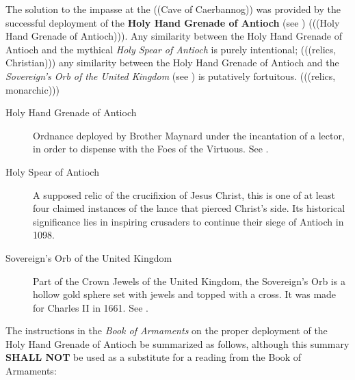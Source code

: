 \documentclass{metanorma}
\let\bcp\relax%
\begin{document}

The solution to the impasse at the ((Cave of Caerbannog)) was
provided by the successful deployment of the
\textbf{Holy Hand Grenade of Antioch} (see )
(((Holy Hand Grenade of Antioch))).
Any similarity between the Holy Hand Grenade of Antioch and the
mythical \textit{Holy Spear of Antioch} is purely intentional;
(((relics, Christian))) any similarity between the Holy Hand Grenade
of Antioch and the \textit{Sovereign's Orb of the United Kingdom}
(see ) is putatively fortuitous.
(((relics, monarchic)))



\begin{description}
  \item[Holy Hand Grenade of Antioch]
    Ordnance deployed by Brother Maynard under the incantation of a
    lector, in order to dispense with the Foes of the Virtuous.
    See .
  \item[Holy Spear of Antioch]
    A supposed relic of the crucifixion of Jesus Christ, this is one
    of at least four claimed instances of the lance that pierced
    Christ's side. Its historical significance lies in inspiring
    crusaders to continue their siege of Antioch in 1098.
  \item[Sovereign's Orb of the United Kingdom]
    Part of the Crown Jewels of the United Kingdom, the Sovereign's
    Orb is a hollow gold sphere set with jewels and topped with a
    cross.  It was made for Charles II in 1661. 
    See .
\end{description}



The instructions in the \textit{Book of Armaments} on the proper deployment
of the Holy Hand Grenade of Antioch \bcp{may} be summarized as
follows, although this summary \textbf{SHALL NOT} be used as a substitute
for a reading from the Book of Armaments:



\end{document}
